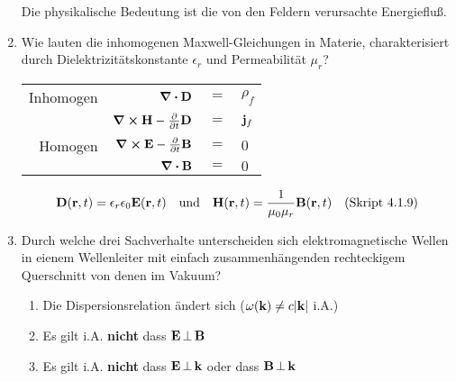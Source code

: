 \begin{enumerate}
        \begin{center}
          Die physikalische Bedeutung ist die von den 
          Feldern verursachte Energiefluß.
        \end{center}

  \clearpage
  \item Wie lauten die inhomogenen Maxwell-Gleichungen in Materie,
        charakterisiert durch Dielektrizitätskonstante $\epsilon_r$ und
        Permeabilität $\mu_r$?
        \begin{center}
          \begin{tabular}{rrcl}
            Inhomogen&$\div \vb D$ & $=$ &$\rho_f$\\
            &$\curl \vb H-\pdv{t}\vb D$ & $=$ &$\vb j_f$\\
            Homogen&$\curl \vb E-\pdv{t}\vb B$ & $=$ &$0$\\
            &$\div \vb B$ & $=$ &$0$\\
          \end{tabular}
          $$\vb D(\vb r,t)=\epsilon_r\epsilon_0\vb E(\vb r,t) \quad
          \text{und}\quad\vb H(\vb r, t)=\frac{1}{\mu_0\mu_r}
          \vb B(\vb r,t)\quad\text{(Skript 4.1.9)}$$
        \end{center}

  \item Durch welche drei Sachverhalte unterscheiden sich 
        elektromagnetische Wellen in eienem Wellenleiter mit einfach
        zusammenhängenden rechteckigem Querschnitt von denen im Vakuum?
        \begin{enumerate}
          \item Die Dispersionsrelation ändert sich 
                ($\omega(\vb k)\ne c\abs{\vb k}$ i.A.)
          \item Es gilt i.A. \textbf{nicht} dass $\vb E\,\bot\,\vb B$
          \item Es gilt i.A. \textbf{nicht} dass $\vb E\,\bot\,\vb k$
                oder dass $\vb B\,\bot\,\vb k$
        \end{enumerate}
        \begin{center}
        \end{center}


\end{enumerate}
